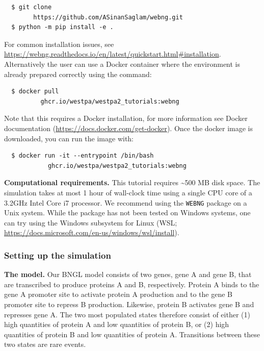 \begin{verbatim}
  $ git clone 
        https://github.com/ASinanSaglam/webng.git
  $ python -m pip install -e .
\end{verbatim}

For common installation issues, see {\url{https://webng.readthedocs.io/en/latest/quickstart.html#installation}}. Alternatively the user can use a Docker container where the environment is already prepared correctly using the command: 
\begin{verbatim}
  $ docker pull 
          ghcr.io/westpa/westpa2_tutorials:webng
\end{verbatim}

Note that this requires a Docker installation, for more information see Docker documentation ({\url{https://docs.docker.com/get-docker}}). 
Once the docker image is downloaded, you can run the image with:
\begin{verbatim}
  $ docker run -it --entrypoint /bin/bash 
            ghcr.io/westpa/westpa2_tutorials:webng
\end{verbatim}

\textbf{Computational requirements.} This tutorial requires \textasciitilde500 MB disk space. 
The simulation takes at most 1 hour of wall-clock time using a single CPU core of a 3.2GHz Intel Core i7 processor. 
We recommend using the \verb|WEBNG| package on a Unix system. 
While the package has not been tested on Windows systems, one can try using the Windows subsystem for Linux (WSL; {\url{https://docs.microsoft.com/en-us/windows/wsl/install}}).

\subsubsection{Setting up the simulation}

\noindent\textbf{The model.} Our BNGL model consists of two genes, gene A and gene B, that are transcribed to produce proteins A and B, respectively. 
Protein A binds to the gene A promoter site to activate protein A production and to the gene B promoter site to repress B production. 
Likewise, protein B activates gene B and represses gene A. 
The two most populated states therefore consist of either (1) high quantities of protein A and low quantities of protein B, or (2) high quantities of protein B and low quantities of protein A. 
Transitions between these two states are rare events. 

